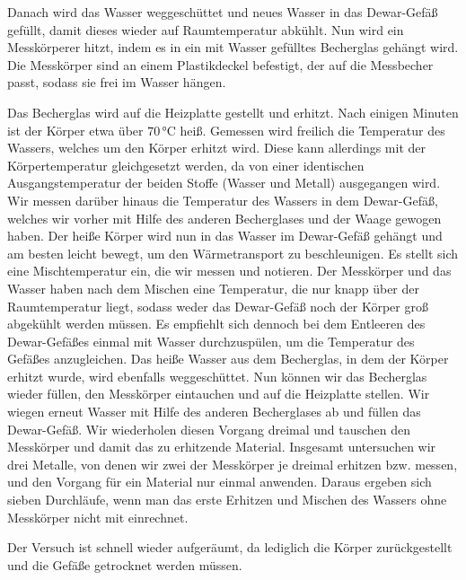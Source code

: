 Danach wird das Wasser weggeschüttet und neues Wasser in das Dewar-Gefäß gefüllt, damit dieses wieder auf Raumtemperatur abkühlt.
Nun wird ein Messkörperer hitzt, indem es in ein mit Wasser gefülltes Becherglas gehängt wird. Die Messkörper sind an einem Plastikdeckel befestigt, der auf %
die Messbecher passt, sodass sie frei im Wasser hängen.

Das Becherglas wird auf die Heizplatte gestellt und erhitzt. 
Nach einigen Minuten ist der Körper etwa über $70 \, \si{\celsius}$ heiß. %
Gemessen wird freilich die Temperatur des Wassers, welches um den Körper erhitzt wird. 
Diese kann allerdings mit der Körpertemperatur gleichgesetzt werden, da von einer identischen Ausgangstemperatur der beiden Stoffe (Wasser und Metall) ausgegangen wird. %
Wir messen darüber hinaus die Temperatur des Wassers in dem Dewar-Gefäß, welches wir vorher mit Hilfe des anderen Becherglases und der Waage gewogen haben. %
Der heiße Körper wird nun in das Wasser im Dewar-Gefäß gehängt und am besten leicht bewegt, um den Wärmetransport zu beschleunigen.
Es stellt sich eine Mischtemperatur ein, die wir messen und notieren. Der Messkörper und das Wasser haben nach dem Mischen eine Temperatur, %
die nur knapp über der Raumtemperatur liegt, sodass weder das Dewar-Gefäß noch der Körper groß abgekühlt werden müssen.
Es empfiehlt sich dennoch bei dem Entleeren des Dewar-Gefäßes einmal mit Wasser durchzuspülen, um die Temperatur des Gefäßes anzugleichen.
Das heiße Wasser aus dem Becherglas, in dem der Körper erhitzt wurde, wird ebenfalls weggeschüttet.
Nun können wir das Becherglas wieder füllen, den Messkörper eintauchen und auf die Heizplatte stellen. %
Wir wiegen erneut Wasser mit Hilfe des anderen Becherglases ab und füllen das Dewar-Gefäß. %
Wir wiederholen diesen Vorgang dreimal und tauschen den Messkörper und damit das zu erhitzende Material. %
Insgesamt untersuchen wir drei Metalle, von denen wir zwei der Messkörper je dreimal erhitzen bzw. messen, und den Vorgang für ein Material nur %
einmal anwenden. Daraus ergeben sich sieben Durchläufe, wenn man das erste Erhitzen und Mischen des Wassers ohne Messkörper nicht mit einrechnet.

Der Versuch ist schnell wieder aufgeräumt, da lediglich die Körper zurückgestellt und die Gefäße getrocknet werden müssen.
\pagebreak